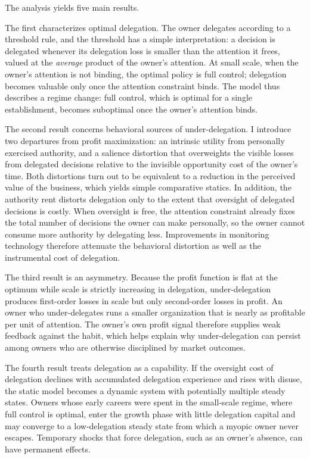 \documentclass[11pt,a4paper]{article}
\theoremstyle{plain}
\begin{document}
The analysis yields five main results.

The first characterizes optimal delegation. The owner delegates according to a threshold rule, and the threshold has a simple interpretation: a decision is delegated whenever its delegation loss is smaller than the attention it frees, valued at the \emph{average} product of the owner's attention. At small scale, when the owner's attention is not binding, the optimal policy is full control; delegation becomes valuable only once the attention constraint binds. The model thus describes a regime change: full control, which is optimal for a single establishment, becomes suboptimal once the owner's attention binds.

The second result concerns behavioral sources of under-delegation. I introduce two departures from profit maximization: an intrinsic utility from personally exercised authority, and a salience distortion that overweights the visible losses from delegated decisions relative to the invisible opportunity cost of the owner's time. Both distortions turn out to be equivalent to a reduction in the perceived value of the business, which yields simple comparative statics. In addition, the authority rent distorts delegation only to the extent that oversight of delegated decisions is costly. When oversight is free, the attention constraint already fixes the total number of decisions the owner can make personally, so the owner cannot consume more authority by delegating less. Improvements in monitoring technology therefore attenuate the behavioral distortion as well as the instrumental cost of delegation.

The third result is an asymmetry. Because the profit function is flat at the optimum while scale is strictly increasing in delegation, under-delegation produces first-order losses in scale but only second-order losses in profit. An owner who under-delegates runs a smaller organization that is nearly as profitable per unit of attention. The owner's own profit signal therefore supplies weak feedback against the habit, which helps explain why under-delegation can persist among owners who are otherwise disciplined by market outcomes.

The fourth result treats delegation as a capability. If the oversight cost of delegation declines with accumulated delegation experience and rises with disuse, the static model becomes a dynamic system with potentially multiple steady states. Owners whose early careers were spent in the small-scale regime, where full control is optimal, enter the growth phase with little delegation capital and may converge to a low-delegation steady state from which a myopic owner never escapes. Temporary shocks that force delegation, such as an owner's absence, can have permanent effects.
\end{document}
